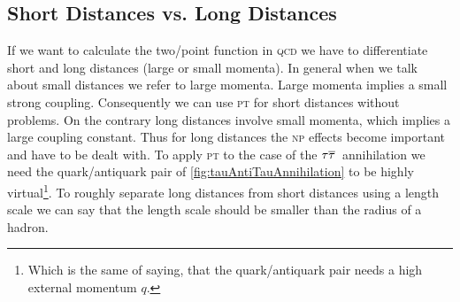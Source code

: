 \documentclass[../../index.tex]{subfiles}
\begin{document}
\subsection{Short Distances vs. Long Distances}
If we want to calculate the two\-/point function in \textsc{qcd} we have to
differentiate short and long distances (large or small momenta). In general when
we talk about small distances we refer to large momenta. Large momenta implies a
small strong coupling. Consequently we can use \textsc{pt} for short distances
without problems. On the contrary long distances involve small momenta, which
implies a large coupling constant. Thus for long distances the \textsc{np}
effects become important and have to be dealt with. To apply \textsc{pt} to the
case of the \(\tau\overline{\tau}\,\) annihilation we need the quark\-/antiquark pair
of \cref{fig:tauAntiTauAnnihilation} to be highly virtual\footnote{Which is the
  same of saying, that the quark\-/antiquark pair needs a high external momentum
  \(q\).}. To roughly separate long distances from short distances using a
length scale we can say that the length scale should be smaller than the radius
of a hadron.
\end{document}
